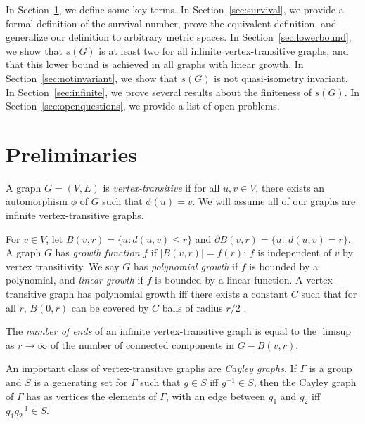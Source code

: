 \documentclass[11pt]{article}
\begin{document}
In Section~\ref{preliminaries}, we define some key terms. In Section~\ref{sec:survival}, we provide a formal definition of the survival number, prove the equivalent definition, and generalize our definition to arbitrary metric spaces. In Section~\ref{sec:lowerbound}, we show that $s(G)$ is at least two for all infinite vertex-transitive graphs, and that this lower bound is achieved in all graphs with linear growth. In Section~\ref{sec:notinvariant}, we show that $s(G)$ is not quasi-isometry invariant. In Section~\ref{sec:infinite}, we prove several results about the finiteness of $s(G)$. In Section~\ref{sec:openquestions}, we provide a list of open problems.


\section{Preliminaries}
\label{preliminaries}
A graph $G = (V,E)$ is {\em vertex-transitive} if for all $u, v \in V$, there exists an automorphism $\phi$ of $G$ such that $\phi(u) = v$. We will assume all of our graphs are infinite vertex-transitive graphs.

For $v \in V$, let $B(v,r) = \{u: d(u,v) \leq r\}$ and $\partial B(v,r) = \{u :\ d(u,v) = r\}$. A graph $G$ has {\em growth function} $f$ if $\bigl| B(v,r) \bigr| = f(r)$; $f$ is independent of $v$ by vertex transitivity. We say $G$ has {\em polynomial growth} if $f$ is bounded by a polynomial, and {\em linear growth} if $f$ is bounded by a linear function. A vertex-transitive graph has polynomial growth iff there exists a constant $C$ such that for all $r$, $B(0,r)$ can be covered by $C$ balls of radius $r/2$ \cite{doubling}.

The {\em number of ends} of an infinite vertex-transitive graph is equal to the $\limsup$ as $r \rightarrow \infty$ of the number of connected components in $G-B(v,r)$.

An important class of vertex-transitive graphs are {\em Cayley graphs}. If $\Gamma$ is a group and $S$ is a generating set for $\Gamma$ such that $g \in S$ iff $g^{-1} \in S$, then the Cayley graph of $\Gamma$ has as vertices the elements of $\Gamma$, with an edge between $g_1$ and $g_2$ iff $g_1g_2^{-1} \in S$. 
\end{document}
